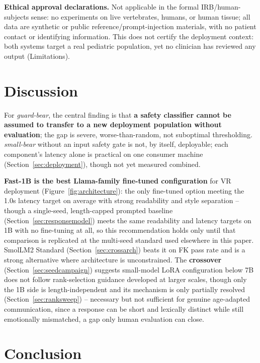 \documentclass[pdflatex,sn-mathphys-num]{sn-jnl-official}%
\begin{document}
\textbf{Ethical approval declarations.} Not applicable in the formal IRB/human-subjects sense: no experiments on live vertebrates, humans, or human tissue; all data are synthetic or public reference/prompt-injection materials, with no patient contact or identifying information. This does not certify the deployment context: both systems target a real pediatric population, yet no clinician has reviewed any output (Limitations).

\section{Discussion}\label{sec:discussion}

For \textit{guard-bear}, the central finding is that \textbf{a safety classifier cannot be assumed to transfer to a new deployment population without evaluation}; the gap is severe, worse-than-random, not suboptimal thresholding. \textit{small-bear} without an input safety gate is not, by itself, deployable; each component's latency alone is practical on one consumer machine (Section~\ref{sec:deployment}), though not yet measured combined.

\textbf{Fast-1B is the best Llama-family fine-tuned configuration} for VR deployment (Figure~\ref{fig:architecture}): the only fine-tuned option meeting the 1.0s latency target on average with strong readability and style separation -- though a single-seed, length-capped prompted baseline (Section~\ref{sec:responsemodel}) meets the same readability and latency targets on 1B with no fine-tuning at all, so this recommendation holds only until that comparison is replicated at the multi-seed standard used elsewhere in this paper. SmolLM2 Standard (Section~\ref{sec:crossarch}) beats it on FK pass rate and is a strong alternative where architecture is unconstrained. The \textbf{crossover} (Section~\ref{sec:seedcampaign}) suggests small-model LoRA configuration below 7B does not follow rank-selection guidance developed at larger scales, though only the 1B side is length-independent and its mechanism is only partially resolved (Section~\ref{sec:ranksweep}) -- necessary but not sufficient for genuine age-adapted communication, since a response can be short and lexically distinct while still emotionally mismatched, a gap only human evaluation can close.

\section{Conclusion}\label{sec:conclusion}
\end{document}
